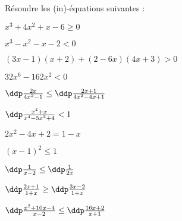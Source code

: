 
\begin{exercice}
 Résoudre les (in)-équations suivantes : 

\begin{enumerate}
\begin{minipage}[t]{0.45\textwidth}

\item $x^3+4x^2+x-6\geq 0 $ 
\item  $x^3-x^2-x-2<0 $ 
\item  $(3x-1)(x+2)+(2-6x)(4x+3)>0$
\item $32x^6-162x^2<0$
\item  $\ddp\frac{2x}{4x^2-1}\leq \ddp\frac{2x+1}{4x^2-4x+1}$
\item  $ \ddp\frac{x^4+x}{x^4-5x^2+4}<1 $
\end{minipage}
\begin{minipage}[t]{0.45\textwidth}
\item  $2x^2-4x+2=1-x$
\item  $(x-1)^2\leq 1$
\item $\ddp\frac{1}{x-2}\leq \ddp\frac{1}{2x}$
\item $\ddp\frac{2x+1}{1+x}\geq \ddp\frac{3x-2}{1+x}$
\item $\ddp\frac{x^2+10x-4}{x-2}\leq \ddp\frac{16x+2}{x+1}$


\end{minipage}
\end{enumerate}

\end{exercice}